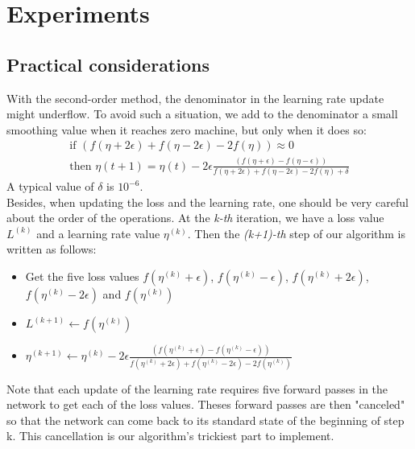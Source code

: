 \documentclass{article}
\begin{document}
  
  \section{Experiments}
  
  \subsection{Practical considerations}
  
  With the second-order method, the denominator in the learning rate update might underflow. To avoid such a situation, we add to the denominator a small smoothing value when it reaches zero machine, but only when it does so:\\
  \begin{align}
  \text{if } (f(\eta+2\epsilon)+f(\eta-2\epsilon)-2f(\eta)) \approx 0\\
  \text{then }\eta(t+1) = \eta(t) - 2\epsilon\frac{(f(\eta+\epsilon)-f(\eta-\epsilon))}{f(\eta+2\epsilon)+f(\eta-2\epsilon)-2f(\eta)+\delta}
  \end{align}
  A typical value of $\delta$ is $10^{-6}$. \\
  
  Besides, when updating the loss and the learning rate, one should be very careful about the order of the operations. At the \emph{k-th} iteration, we have a loss value $L^{(k)}$ and a learning rate value $\eta^{(k)}$. Then the \emph{(k+1)-th} step of our algorithm is written as follows:\\
  \begin{itemize}
  	\item Get the five loss values $f(\eta^{(k)}+\epsilon)$, $f(\eta^{(k)}-\epsilon)$, $f(\eta^{(k)}+2\epsilon)$, $f(\eta^{(k)}-2\epsilon)$ and $f(\eta^{(k)})$
  	\item $L^{(k+1)} \leftarrow f(\eta^{(k)})$
  	\item $\eta^{(k+1)} \leftarrow \eta^{(k)} -2\epsilon\frac{(f(\eta^{(k)}+\epsilon)-f(\eta^{(k)}-\epsilon))}{f(\eta^{(k)}+2\epsilon)+f(\eta^{(k)}-2\epsilon)-2f(\eta^{(k)})}$
  \end{itemize}

  Note that each update of the learning rate requires five forward passes in the network to get each of the loss values. Theses forward passes are then "canceled" so that the network can come back to its standard state of the beginning of step k. This cancellation is our algorithm's trickiest part to implement.\\
  
\end{document}
